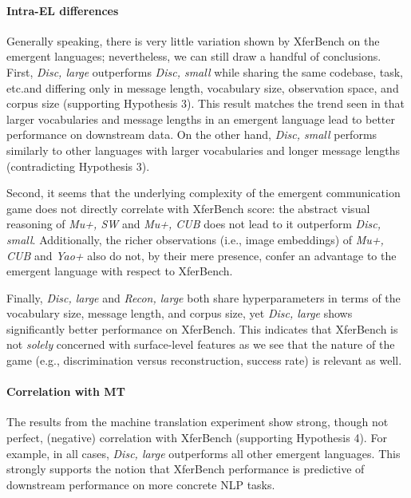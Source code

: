 \paragraph{Intra-EL differences}
Generally speaking, there is very little variation shown by XferBench on the emergent languages; nevertheless, we can still draw a handful of conclusions.
First, \emph{Disc, large} outperforms \emph{Disc, small} while sharing the same codebase, task, etc.\@ and differing only in message length, vocabulary size, observation space, and corpus size (supporting Hypothesis 3).
This result matches the trend seen in \citet{yao2022linking} that larger vocabularies and message lengths in an emergent language lead to better performance on downstream data.
On the other hand, \emph{Disc, small} performs similarly to other languages with larger vocabularies and longer message lengths (contradicting Hypothesis 3).

Second, it seems that the underlying complexity of the emergent communication game does not directly correlate with XferBench score: the abstract visual reasoning of \emph{Mu+, SW} and \emph{Mu+, CUB} does not lead to it outperform \emph{Disc, small}.
Additionally, the richer observations (i.e., image embeddings) of \emph{Mu+, CUB} and \emph{Yao+} also do not, by their mere presence, confer an advantage to the emergent language with respect to XferBench.

Finally, \emph{Disc, large} and \emph{Recon, large} both share hyperparameters in terms of the vocabulary size, message length, and corpus size, yet \emph{Disc, large} shows significantly better performance on XferBench.
This indicates that XferBench is not \emph{solely} concerned with surface-level features as we see that the nature of the game (e.g., discrimination versus reconstruction, success rate) is relevant as well.


\paragraph{Correlation with MT}
The results from the machine translation experiment show strong, though not perfect, (negative) correlation with XferBench (supporting Hypothesis 4).
For example, in all cases, \emph{Disc, large} outperforms all other emergent languages.
This strongly supports the notion that XferBench performance is predictive of downstream performance on more concrete NLP tasks.

